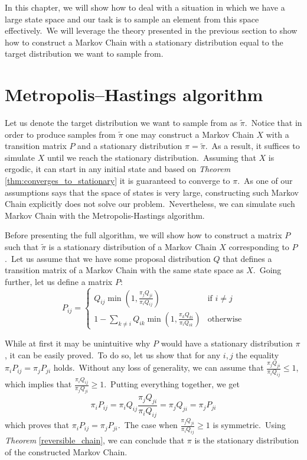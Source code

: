 \documentclass[a4paper, 11pt, onecolumn, openany, titlepage]{report}
\theoremstyle{default_theorem_style}\newtheorem{theorem}{Theorem}
\theoremstyle{default_theorem_style}\newtheorem{definition}{Definition}
\begin{document}
In this chapter, we will show how to deal with a situation in which we have a large state space and our task is to
sample an element from this space effectively.\ We will leverage the theory presented in the previous section to
show how to construct a Markov Chain with a stationary distribution equal to the target distribution we want to
sample from.

\section{Metropolis–Hastings algorithm}

Let us denote the target distribution we want to sample from as $\tilde{\pi}$.\ Notice that in order to produce samples
from $\tilde{\pi}$ one may construct a Markov Chain $X$ with a transition matrix $P$ and a stationary distribution
$\pi = \tilde{\pi}$.\ As a result, it suffices to simulate $X$ until we reach the stationary distribution.\ Assuming
that $X$ is ergodic, it can start in any initial state and based on \textit{Theorem} \ref{thm:converges_to_stationary}
it is guaranteed to converge to $\pi$.\ As one of our assumptions says that the space of states is very large,
constructing such Markov Chain explicitly does not solve our problem.\ Nevertheless, we can simulate such Markov Chain
with the Metropolis-Hastings algorithm.\newline

Before presenting the full algorithm, we will show how to construct a matrix $P$ such that $\tilde{\pi}$ is a
stationary distribution of a Markov Chain $X$ corresponding to $P$.\ Let us assume that we have some proposal
distribution $Q$ that defines a transition matrix of a Markov Chain with the same state space as $X$.\ Going further,
let us define a matrix $P$:\newline
$$
P_{ij} =
\begin{cases}
  Q_{ij}\min{(1, \frac{\pi_j Q_{ji}}{\pi_i Q_{ij}})} &\text{if $i \ne j$}\\
  1 - \sum\limits_{k \ne i}Q_{ik} \min{(1, \frac{\pi_k Q_{ki}}{\pi_i Q_{ik}})} &\text{otherwise}
\end{cases}
$$

While at first it may be unintuitive why $P$ would have a stationary distribution $\pi$, it can be easily
proved.\ To do so, let us show that for any $i, j$ the equality $\pi_i P_{ij} = \pi_j P_{ji}$ holds.\ Without
any loss of generality, we can assume that $\frac{\pi_j Q_{ji}}{\pi_i Q_{ij}} \leq 1$, which implies that
$\frac{\pi_i Q_{ij}}{\pi_j Q_{ji}} \geq 1$.\ Putting everything together, we get
$$
\pi_i P_{ij} = \pi_i Q_{ij} \frac{\pi_j Q_{ji}}{\pi_i Q_{ij}} = \pi_j Q_{ji} = \pi_j P_{ji}
$$
which proves that $\pi_i P_{ij} = \pi_j P_{ji}$.\ The case when $\frac{\pi_j Q_{ji}}{\pi_i Q_{ij}} \geq 1$ is
symmetric.\ Using \textit{Theorem} \ref{reversible_chain}, we can conclude that $\pi$ is the stationary distribution
of the constructed Markov Chain.\newline
\end{document}
